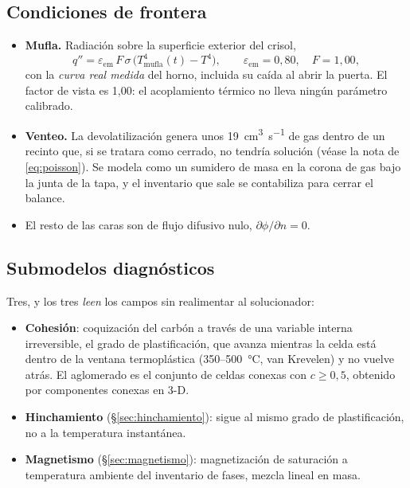 \subsection{Condiciones de frontera}

\begin{itemize}[leftmargin=*,itemsep=3pt]
\item \textbf{Mufla.} Radiación sobre la superficie exterior del crisol,
\begin{equation}
q'' = \varepsilon_{\mathrm{em}}\,F\,\sigma\,\big(T_{\mathrm{mufla}}^{4}(t) - T^{4}\big),
\qquad \varepsilon_{\mathrm{em}} = 0{,}80,\quad F = 1{,}00,
\end{equation}
con la \emph{curva real medida} del horno, incluida su caída al abrir la puerta.
El factor de vista es 1,00: el acoplamiento térmico no lleva ningún parámetro
calibrado.
\item \textbf{Venteo.} La devolatilización genera unos
\qty{19}{\centi\meter\cubed\per\second} de gas dentro de un recinto que, si se
tratara como cerrado, no tendría solución (véase la nota de
\eqref{eq:poisson}). Se modela como un sumidero de masa en la corona de gas bajo
la junta de la tapa, y el inventario que sale se contabiliza para cerrar el
balance.
\item El resto de las caras son de flujo difusivo nulo, $\partial\phi/\partial n = 0$.
\end{itemize}

\subsection{Submodelos diagnósticos}

Tres, y los tres \emph{leen} los campos sin realimentar al solucionador:

\begin{itemize}[leftmargin=*,itemsep=2pt]
\item \textbf{Cohesión}: coquización del carbón a través de una variable interna
irreversible, el grado de plastificación, que avanza mientras la celda está
dentro de la ventana termoplástica (350--\SI{500}{\celsius}, van Krevelen) y no
vuelve atrás. El aglomerado es el conjunto de celdas conexas con
$c \geq 0{,}5$, obtenido por componentes conexas en 3-D.
\item \textbf{Hinchamiento} (\S\ref{sec:hinchamiento}): sigue al mismo grado de
plastificación, no a la temperatura instantánea.
\item \textbf{Magnetismo} (\S\ref{sec:magnetismo}): magnetización de saturación
a temperatura ambiente del inventario de fases, mezcla lineal en masa.
\end{itemize}

